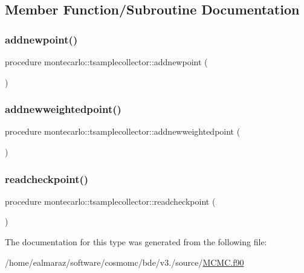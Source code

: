 \subsection{Member Function/\+Subroutine Documentation}
\mbox{\label{structmontecarlo_1_1tsamplecollector_a497d033a0d0e0cdf0af7efb536f4632d}} 
\subsubsection{\texorpdfstring{addnewpoint()}{addnewpoint()}}
{\footnotesize\ttfamily procedure montecarlo\+::tsamplecollector\+::addnewpoint (\begin{DoxyParamCaption}{ }\end{DoxyParamCaption})\hspace{0.3cm}{\ttfamily [private]}}

\mbox{\label{structmontecarlo_1_1tsamplecollector_aadbe71aee67bf84642513335af8facc5}} 
\subsubsection{\texorpdfstring{addnewweightedpoint()}{addnewweightedpoint()}}
{\footnotesize\ttfamily procedure montecarlo\+::tsamplecollector\+::addnewweightedpoint (\begin{DoxyParamCaption}{ }\end{DoxyParamCaption})\hspace{0.3cm}{\ttfamily [private]}}

\mbox{\label{structmontecarlo_1_1tsamplecollector_a7ecc8abd8277ce35862d40c8a5db4d18}} 
\subsubsection{\texorpdfstring{readcheckpoint()}{readcheckpoint()}}
{\footnotesize\ttfamily procedure montecarlo\+::tsamplecollector\+::readcheckpoint (\begin{DoxyParamCaption}{ }\end{DoxyParamCaption})\hspace{0.3cm}{\ttfamily [private]}}



The documentation for this type was generated from the following file\+:\begin{DoxyCompactItemize}
\item 
/home/ealmaraz/software/cosmomc/bde/v3./source/\mbox{\hyperlink{MCMC_8f90}{M\+C\+M\+C.\+f90}}\end{DoxyCompactItemize}
